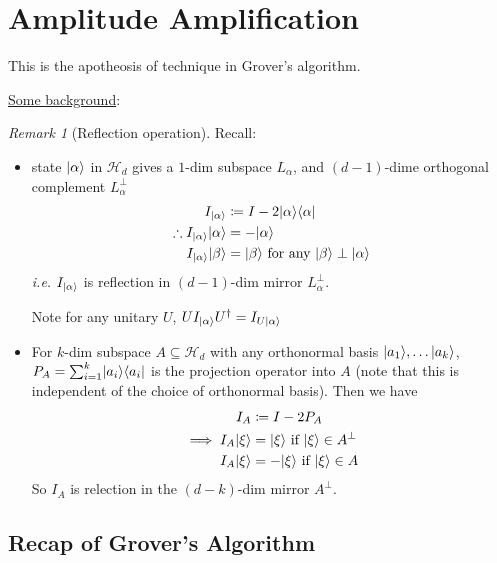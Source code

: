 \documentclass[]{article}
\DeclarePairedDelimiter\bra{\langle}{\rvert}
\DeclarePairedDelimiter\ket{\lvert}{\rangle}
\theoremstyle{custhm}
\theoremstyle{cusdef}
\theoremstyle{custhm}
\theoremstyle{custhm}
\theoremstyle{custhm}
\theoremstyle{custhm}
\theoremstyle{cusdef}
\theoremstyle{remark}
\newtheorem*{remark*}{Remark}
\begin{document}
\section*{Amplitude Amplification}

	This is the apotheosis of technique in Grover's algorithm.

	\underline{Some background}:

	\begin{remark*}[Reflection operation] Recall:
		\begin{itemize}
			\item state $\ket{\alpha}$ in $\mathcal{H}_d$ gives a $1$-dim subspace $L_\alpha$, and $(d-1)$-dime orthogonal complement $L_\alpha^{\perp}$
			\begin{align*}
				I_{\ket{\alpha}} &\coloneqq I - 2\ket{\alpha}\bra{\alpha}\\
				\therefore I_{\ket{\alpha}}\ket{\alpha} &= - \ket{\alpha}\\
				I_{\ket{\alpha}}\ket{\beta} &= \ket{\beta}\ \textrm{for any }\ket{\beta}\perp\ket{\alpha}
			\end{align*}
			\textit{i.e.} $I_{\ket{\alpha}}$ is reflection in $(d-1)$-dim mirror $L_\alpha^\perp$.

			Note for any unitary $U$, $UI_{\ket{\alpha}}U^\dagger = I_{U\ket{\alpha}}$

			\item For $k$-dim subspace $A\subseteq \mathcal{H}_d$ with any orthonormal basis $\ket{a_1},\dots \ket{a_k}$, $P_A = \sum_{i=1}^{k} \ket{a_i}\bra{a_i}$ is the projection operator into $A$ (note that this is independent of the choice of orthonormal basis). Then we have
			\begin{align*}
				I_A &\coloneqq I - 2P_A\\
				\implies I_A\ket{\xi} &= \ket{\xi}\textrm{ if }\ket{\xi}\in A^{\perp}\\
				I_A\ket{\xi} &= -\ket{\xi}\textrm{ if }\ket{\xi}\in A
			\end{align*}
			So $I_A$ is relection in the $(d-k)$-dim mirror $A^\perp$.
		\end{itemize}
	\end{remark*}

\subsection*{Recap of Grover's Algorithm}
\end{document}
